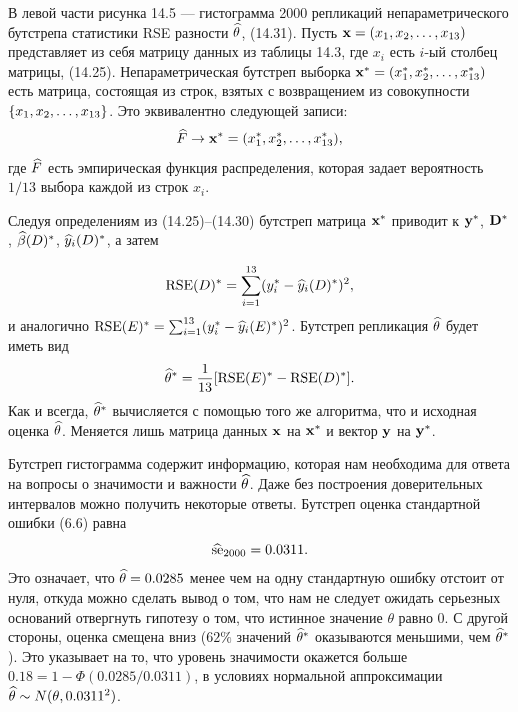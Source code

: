 В левой части рисунка 14.5 --- гистограмма 2000 репликаций непараметрического бутстрепа статистики RSE разности $\widehat{\theta}$, (14.31). Пусть $\mathbf x = (x_1,x_2,\ldots,x_{13})$ представляет из себя матрицу данных из таблицы 14.3, где $x_i$ есть $i$-ый столбец матрицы, (14.25). Непараметрическая бутстреп выборка $\mathbf x^* = (x_1^*,x_2^*,\ldots,x_{13}^*)$ есть матрица, состоящая из строк, взятых с возвращением из совокупности $\{x_1,x_2,\ldots,x_{13}\}$. Это эквивалентно следующей записи:
\begin{equation}
  \widehat{F} \rightarrow\mathbf x^* = (x_1^*,x_2^*,\ldots,x_{13}^*),
\end{equation}
где $\widehat{F}$ есть эмпирическая функция распределения, которая задает вероятность $1/13$ выбора каждой из строк $x_i$.

Следуя определениям из (14.25)--(14.30) бутстреп матрица $\mathbf x^*$ приводит к $\mathbf y^*$, $\mathbf D^*$, $\widehat{\beta}(D)^*$, $\widehat{y}_i (D)^*$, а затем

\begin{equation}
  \text{RSE}(D)^* = \sum_{i = 1}^{13} (y_i^* - \widehat{y}_i(D)^*)^2,
\end{equation}
и аналогично $\text{RSE}(E)^* = \sum_{i = 1}^{13} (y_i^* - \widehat{y}_i(E)^*)^2$. Бутстреп репликация $\widehat{\theta}$ будет иметь вид
\begin{equation}
  \widehat{\theta}^* = \frac{1}{13}[\text{RSE}(E)^* - \text{RSE}(D)^*].
\end{equation}
Как и всегда, $\widehat{\theta}^*$ вычисляется с помощью того же алгоритма, что и исходная оценка $\widehat{\theta}$. Меняется лишь матрица данных $\mathbf x$ на $\mathbf x^*$ и вектор $\mathbf y$ на $\mathbf y^*$. 

Бутстреп гистограмма содержит информацию, которая нам необходима для ответа на вопросы  о значимости и важности $\widehat{\theta}$. Даже без построения доверительных интервалов можно получить некоторые ответы. Бутстреп оценка стандартной ошибки (6.6) равна
\begin{equation}
  \widehat{\text{se}}_{2000} = 0.0311.
\end{equation}
Это означает, что $\widehat{\theta} = 0.0285$ менее чем на одну стандартную ошибку отстоит от нуля, откуда можно сделать вывод о том, что нам не следует ожидать серьезных оснований отвергнуть гипотезу о том, что истинное значение $\theta$ равно 0. С другой стороны, оценка смещена вниз ($62\%$ значений $\widehat{\theta}^*$ оказываются меньшими, чем $\widehat{\theta}^*$). Это указывает на то, что уровень значимости окажется больше $0.18 = 1 - \Phi(0.0285/0.0311)$, в условиях нормальной аппроксимации $\widehat{\theta} \sim N(\theta,0.0311^2)$.

